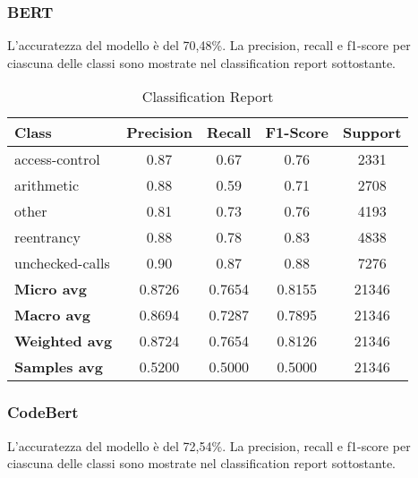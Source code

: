 \documentclass[../../Thesis.tex]{subfiles}
\begin{document}
\subsubsection{BERT}
L'accuratezza del modello è del 70,48\%. La precision, recall e f1-score per ciascuna delle classi sono mostrate nel classification report sottostante.\\

\begin{table}[H]
\centering
\small
\begin{tabular}{lcccc}
\hline
\textbf{Class} & \textbf{Precision} & \textbf{Recall} & \textbf{F1-Score} & \textbf{Support} \\
\hline
access-control & 0.87 & 0.67 & 0.76 & 2331 \\
arithmetic & 0.88 & 0.59 & 0.71 & 2708 \\
other & 0.81 & 0.73 & 0.76 & 4193 \\
reentrancy & 0.88 & 0.78 & 0.83 & 4838 \\
unchecked-calls & 0.90 & 0.87 & 0.88 & 7276 \\
\hline
\textbf{Micro avg} & 0.8726 & 0.7654 & 0.8155 & 21346 \\
\textbf{Macro avg} & 0.8694 & 0.7287 & 0.7895 & 21346 \\
\textbf{Weighted avg} & 0.8724 & 0.7654 & 0.8126 & 21346 \\
\textbf{Samples avg} & 0.5200 & 0.5000 & 0.5000 & 21346 \\
\hline
\end{tabular}
\caption{Classification Report}
\end{table}

\subsubsection{CodeBert}

L'accuratezza del modello è del 72,54\%. La precision, recall e f1-score per ciascuna delle classi sono mostrate nel classification report sottostante.
\end{document}
